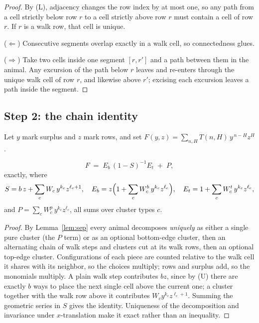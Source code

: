 \documentclass[11pt]{article}
\begin{document}
\begin{proof}
By (L), adjacency changes the row index by at most one, so any path from a cell
strictly below row $r$ to a cell strictly above row $r$ must contain a cell of
row $r$. If $r$ is a walk row, that cell is unique.

($\Leftarrow$) Consecutive segments overlap exactly in a walk cell, so
connectedness glues.

($\Rightarrow$) Take two cells inside one segment $[r,r']$ and a path between
them in the animal. Any excursion of the path below $r$ leaves and re-enters
through the unique walk cell of row $r$, and likewise above $r'$; excising each
excursion leaves a path inside the segment.
\end{proof}

\subsection*{Step 2: the chain identity}

Let $y$ mark surplus and $z$ mark rows, and set
$F(y,z) = \sum_{n,H} T(n,H)\, y^{\,n-H} z^{H}$.

\begin{proposition}
\label{prop:chain}
\[
  F \;=\; E_b\,(1-S)^{-1} E_t \;+\; P,
\]
exactly, where
\[
  S = b\,z + \sum_c W_c\, y^{k_c} z^{\ell_c+1},\quad
  E_b = z\Bigl(1 + \sum_c W^b_c\, y^{k_c} z^{\ell_c}\Bigr),\quad
  E_t = 1 + \sum_c W^t_c\, y^{k_c} z^{\ell_c},
\]
and $P = \sum_c W^p_c\, y^{k_c} z^{\ell_c}$, all sums over cluster types $c$.
\end{proposition}

\begin{proof}
By Lemma~\ref{lem:sep} every animal decomposes \emph{uniquely} as either a single
pure cluster (the $P$ term) or as an optional bottom-edge cluster, then an
alternating chain of walk steps and clusters cut at its walk rows, then an
optional top-edge cluster. Configurations of each piece are counted relative to
the walk cell it shares with its neighbor, so the choices multiply; rows and
surplus add, so the monomials multiply. A plain walk step contributes $b z$,
since by (U) there are exactly $b$ ways to place the next single cell above the
current one; a cluster together with the walk row above it contributes
$W_c y^{k_c} z^{\ell_c+1}$. Summing the geometric series in $S$ gives the
identity. Uniqueness of the decomposition and invariance under $x$-translation
make it exact rather than an inequality.
\end{proof}
\end{document}

